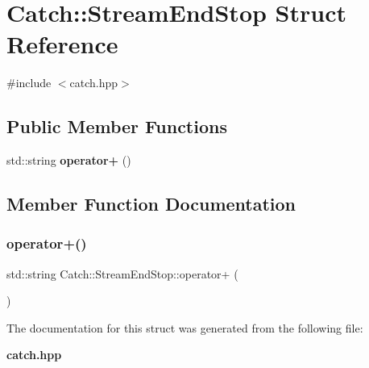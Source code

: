 \section{Catch\+:\+:Stream\+End\+Stop Struct Reference}
\label{struct_catch_1_1_stream_end_stop}


{\ttfamily \#include $<$catch.\+hpp$>$}

\subsection*{Public Member Functions}
\begin{DoxyCompactItemize}
\item 
std\+::string \textbf{ operator+} ()
\end{DoxyCompactItemize}


\subsection{Member Function Documentation}
\mbox{\label{struct_catch_1_1_stream_end_stop_a3025092e06c224e0845f2caa07b26d0e}} 
\subsubsection{operator+()}
{\footnotesize\ttfamily std\+::string Catch\+::\+Stream\+End\+Stop\+::operator+ (\begin{DoxyParamCaption}{ }\end{DoxyParamCaption})\hspace{0.3cm}{\ttfamily [inline]}}



The documentation for this struct was generated from the following file\+:\begin{DoxyCompactItemize}
\item 
\textbf{ catch.\+hpp}\end{DoxyCompactItemize}
